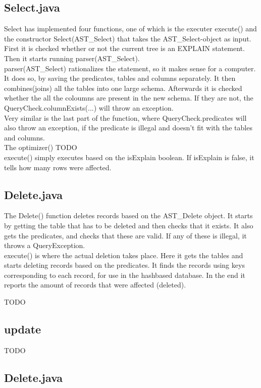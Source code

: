 \documentclass[a4paper,10pt,titlepage]{report}
\begin{document}
\subsection{Select.java}
Select has implemented four functions, one of which is the executer \textsf{execute()} and the constructor \textsf{Select(AST\_Select)} that takes the AST\_Select-object as input. First it is checked whether or not the current tree is an EXPLAIN statement. Then it starts running \textsf{parser(AST\_Select)}.
\\
\textsf{parser(AST\_Select)} rationalizes the statement, so it makes sense for a computer. It does so, by saving the predicates, tables and columns separately. It then combines(joins) all the tables into one large schema. Afterwards it is checked whether the all the coloumns are present in the new schema. If they are not, the \textsf{QueryCheck.columnExists(...)} will throw an exception.\\
Very similar is the last part of the function, where \textsf{QueryCheck.predicates} will also throw an exception, if the predicate is illegal and doesn't fit with the tables and columns.
\\
The \textsf{optimizer()} TODO
\\
\textsf{execute()} simply executes based on the \textsf{isExplain} boolean. If \textsf{isExplain} is false, it tells how many rows were affected.

\subsection{Delete.java}
The \textsf{Delete()} function deletes records based on the \textsf{AST\_Delete} object. It starts by getting the table that has to be deleted and then checks that it exists. It also gets the predicates, and checks that these are valid. If any of these is illegal, it throws a \textsf{QueryException}.
\\
\textsf{execute()} is where the actual deletion takes place. Here it gets the tables and starts deleting records based on the predicates. It finds the records using keys corresponding to each record, for use in the hashbased database. In the end it reports the amount of records that were affected (deleted).

TODO

\subsection{update}
TODO
\subsection{Delete.java}
\end{document}
